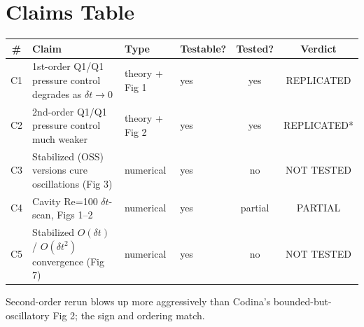 \documentclass[11pt]{article}
\begin{document}
\section{Claims Table}
\begin{center}
\begin{tabular}{clllcc}
\toprule
\# & Claim & Type & Testable? & Tested? & Verdict \\
\midrule
C1 & 1st-order Q1/Q1 pressure control degrades as $\delta t\!\to\!0$ & theory + Fig 1 & yes & yes & REPLICATED \\
C2 & 2nd-order Q1/Q1 pressure control much weaker            & theory + Fig 2 & yes & yes & REPLICATED* \\
C3 & Stabilized (OSS) versions cure oscillations (Fig 3)      & numerical       & yes & no  & NOT TESTED \\
C4 & Cavity Re=100 $\delta t$-scan, Figs 1--2                  & numerical       & yes & partial & PARTIAL \\
C5 & Stabilized $O(\delta t)$ / $O(\delta t^2)$ convergence (Fig 7) & numerical & yes & no & NOT TESTED \\
\bottomrule
\end{tabular}
\end{center}
\noindent*Second-order rerun blows up more aggressively than Codina's bounded-but-oscillatory Fig 2; the sign and ordering match.
\end{document}
